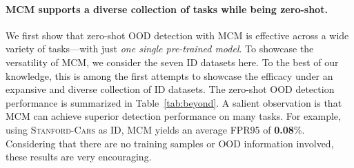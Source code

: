\documentclass{article}
\begin{document}
\paragraph{MCM supports a diverse collection of tasks while being zero-shot.} 
\begin{table}[tb]
\caption{\small Zero-shot OOD detection with MCM score based on CLIP-B/16 with various ID datasets.}
\label{tab:beyond}
\centering
{}
\end{table}
We first show that zero-shot OOD detection with MCM is effective across a wide variety of tasks---with just \emph{one single pre-trained model}. To showcase the versatility of MCM, we consider the seven ID datasets here. 
To the best of our knowledge, this is among the first attempts to showcase the efficacy under an expansive and diverse collection of ID datasets. The zero-shot OOD detection performance is summarized in Table~\ref{tab:beyond}. A salient observation is that MCM can achieve superior detection performance on many tasks. For example, using \textsc{Stanford-Cars} as ID, MCM yields an average FPR95 of \textbf{0.08}\%.
Considering that there are no training samples or OOD information involved, these results are very encouraging.
\end{document}
